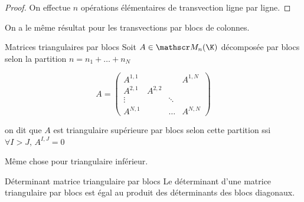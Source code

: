 \begin{proof}
    On effectue $n$ opérations élémentaires de transvection ligne par ligne.
\end{proof}

\begin{remarque}
    On a le même résultat pour les transvections par blocs de colonnes.
\end{remarque}

\begin{definition}{Matrices triangulaires par blocs}{}
    Soit $A \in \mathscr M_{n}(\K)$ décomposée par blocs selon la partition $n = n_1 + \dots + n_N$

    $$A = \left( \begin{array}{c|c|c|c}
        A^{1, 1} & & & A^{1, N} \\
        \hline
        A^{2, 1} & A^{2, 2} & & \\
        \hline
        \vdots & & \ddots &  \\
        \hline
        A^{N, 1} & & \dots & A^{N, N} 
    \end{array}  \right) $$

    on dit que $A$ est triangulaire supérieure par blocs selon cette partition ssi 
    $\forall I > J, \, A^{I, J} = 0$

    Même chose pour triangulaire inférieur. 
    
\end{definition}

\begin{theoreme}{Déterminant matrice triangulaire par blocs }{}
    Le déterminant d'une matrice triangulaire par blocs est égal au produit 
    des déterminants des blocs diagonaux. 
\end{theoreme}


